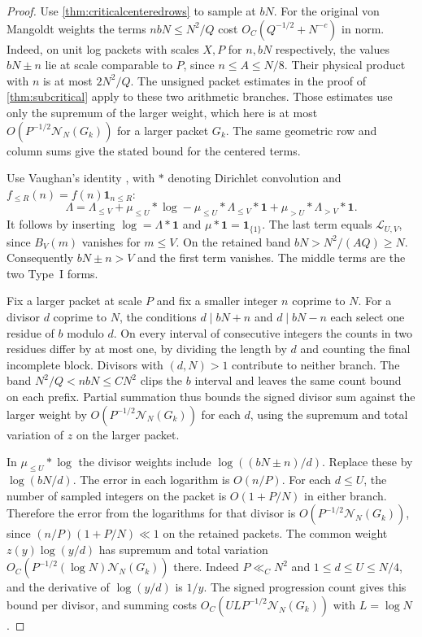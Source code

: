 \documentclass[11pt,a4paper]{article}
\numberwithin{equation}{section}
\newcommand{\NN}{\mathcal N_N}
\begin{document}
\begin{proof}
Use \cref{thm:criticalcenteredrows} to sample at $bN$.
For the original von Mangoldt weights the terms
$nbN\le N^2/Q$ cost $O_C(Q^{-1/2}+N^{-c})$ in norm.
Indeed, on unit log packets with scales $X,P$ for
$n,bN$ respectively, the values $bN\pm n$ lie at
scale comparable to $P$, since $n\le A\le N/8$.
Their physical product with $n$ is at most $2N^2/Q$.
The unsigned packet estimates in the proof of
\cref{thm:subcritical} apply to these two arithmetic
branches. Those estimates use only the supremum of the
larger weight, which here is at most
$O(P^{-1/2}\NN(G_k))$ for a larger packet $G_k$.
The same geometric row and column sums give the stated
bound for the centered terms.

Use Vaughan's identity \cite{VaughanElementary},
with $*$ denoting Dirichlet convolution and
$f_{\le R}(n)=f(n)\mathbf1_{n\le R}$:
\[
 \Lambda=\Lambda_{\le V}+\mu_{\le U}*\log
       -\mu_{\le U}*\Lambda_{\le V}*\mathbf1
       +\mu_{>U}*\Lambda_{>V}*\mathbf1 .
\]
It follows by inserting $\log=\Lambda*\mathbf1$ and
$\mu*\mathbf1=\mathbf1_{\{1\}}$. The last term equals
$\mathcal L_{U,V}$, since $B_V(m)$ vanishes for $m\le V$.
On the retained band $bN>N^2/(AQ)\ge N$. Consequently
$bN\pm n>V$ and the first term vanishes.
The middle terms are the two Type~I forms.

Fix a larger packet at scale $P$ and fix a smaller
integer $n$ coprime to $N$. For a divisor $d$ coprime
to $N$, the conditions $d\mid bN+n$ and $d\mid bN-n$
each select one residue of $b$ modulo $d$.
On every interval of consecutive integers the counts in
two residues differ by at most one, by dividing the
length by $d$ and counting the final incomplete block.
Divisors with $(d,N)>1$ contribute to neither branch.
The band $N^2/Q<nbN\le CN^2$ clips the $b$ interval
and leaves the same count bound on each prefix.
Partial summation thus bounds the signed divisor sum
against the larger weight by $O(P^{-1/2}\NN(G_k))$ for
each $d$, using the supremum and total variation of
$z$ on the larger packet.

In $\mu_{\le U}*\log$ the divisor weights include
$\log((bN\pm n)/d)$. Replace these by $\log(bN/d)$.
The error in each logarithm is $O(n/P)$.
For each $d\le U$, the number of sampled integers on
the packet is $O(1+P/N)$ in either branch. Therefore
the error from the logarithms for that divisor is
$O(P^{-1/2}\NN(G_k))$, since
$(n/P)(1+P/N)\ll1$ on the retained packets.
The common weight $z(y)\log(y/d)$ has supremum and
total variation $O_C(P^{-1/2}(\log N)\NN(G_k))$ there.
Indeed $P\ll_C N^2$ and $1\le d\le U\le N/4$,
and the derivative of $\log(y/d)$ is $1/y$.
The signed progression count gives this bound per
divisor, and summing costs $O_C(ULP^{-1/2}\NN(G_k))$
with $L=\log N$.


\end{proof}
\end{document}
